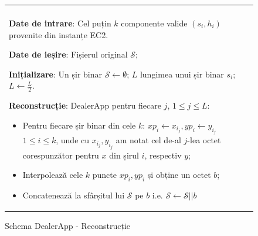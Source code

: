 \documentclass[oneside, 12pt]{book}
\begin{document}
\begin{figure}[h!]

\begin{tabular}{|p{\textwidth}|}
\hline

\\
\hspace{.1in}
\textbf{Date de intrare}: Cel puțin $k$ componente valide $(s_i, h_i)$ provenite din instanțe EC2.

\hspace{.1in}
\textbf{Date de ieșire}: Fișierul original $\mathcal{S}$;
\medskip

\hspace{.1in}
\textbf{Inițializare}: Un șir binar $\mathcal{S} \leftarrow \emptyset$; $L$ lungimea unui șir binar $s_i$; $L \leftarrow \frac{L}{2}$.
\medskip

\hspace{.1in}
\textbf{Reconstrucție}: DealerApp pentru fiecare $j$, $1 \leq j \leq L$:
	\begin{itemize}
		\item Pentru fiecare șir binar din cele $k$: $xp_i \leftarrow x_{i_j}, yp_i \leftarrow y_{i_j}$ $1 \leq i \leq k$, unde cu $x_{i_j}, y_{i_j}$ am notat cel de-al $j$-lea octet corespunzător pentru $x$ din șirul $i$, respectiv $y$;
		\item Interpolează cele $k$ puncte $xp_i, yp_i$ și obține un octet $b$;
		\item Concatenează la sfârșitul lui $\mathcal{S}$ pe $b$ i.e. $\mathcal{S} \leftarrow \mathcal{S} || b$
	\end{itemize}
\\
\hline
\end{tabular}
\caption{Schema DealerApp - Reconstrucție}
\label{fig:DealerApp}
\end{figure}


\end{document}
